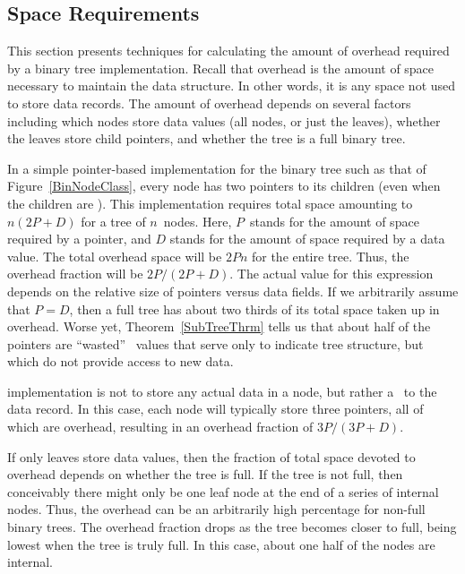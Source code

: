 
\subsection{Space Requirements}

This section presents techniques for calculating the amount of
overhead required by a binary tree implementation.
Recall that overhead is the amount of space necessary to maintain the
data structure.
In other words, it is any space not used to store data records.
The amount of overhead depends on several factors including which
nodes store data values (all nodes, or just the leaves),
whether the leaves store child pointers, and whether the tree is a
full binary tree.

In a simple pointer-based implementation for the binary tree such as
that of Figure~\ref{BinNodeClass}, every node has two pointers to its
children (even when the children are \NULL).
This implementation requires total space amounting to \(n(2P + D)\) for
a tree of \(n\)~nodes.
Here, \(P\)~stands for the amount of space required by a pointer, and
\(D\) stands for the amount of space required by a data value.
The total overhead space will be \(2Pn\) for the entire tree.
Thus, the overhead fraction will be \(2P/(2P + D)\).
The actual value for this expression depends on the relative size of
pointers versus data fields.
If we arbitrarily assume that \(P = D\), then a full tree
has about two thirds of its total space taken up in overhead.
Worse yet, Theorem~\ref{SubTreeThrm}
tells us that about half of the
pointers are ``wasted'' \NULL\ values that serve only to indicate tree
structure, but which do not provide access to new data.

implementation is not to store any actual
data in a node, but rather a \pointref\ to the data record.
In this case, each node will typically store three pointers, all of
which are overhead, resulting in an overhead fraction of
\(3P/(3P + D)\).

If only leaves store data values, then the fraction of total space
devoted to overhead depends on whether the tree is
full. 
If the tree is not full, then conceivably there might only be one leaf
node at the end of a series of internal nodes.
Thus, the overhead can be an arbitrarily high percentage for non-full
binary trees.
The overhead fraction drops as the tree becomes closer to full,
being lowest when the tree is truly full.
In this case, about one half of the nodes are internal.

